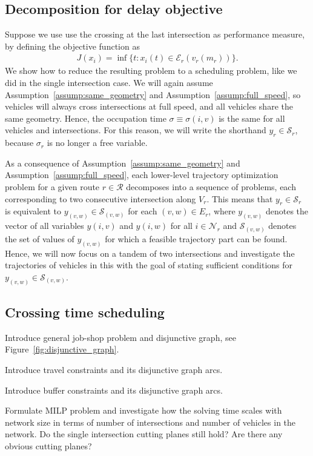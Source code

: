 \documentclass[a4paper]{article}
\theoremstyle{definition}
\theoremstyle{plain}
\begin{document}
\subsection{Decomposition for delay objective}

Suppose we use use the crossing at the last intersection as performance measure, by defining the
objective function as
\begin{align*}
  J(x_{i}) = \inf \{ t: x_{i}(t) \in \mathcal{E}_{r}(v_{r}(m_{r}))\} .
\end{align*}
%
We show how to reduce the resulting problem to a scheduling problem, like we did
in the single intersection case.
%
We will again assume Assumption~\ref{assump:same_geometry} and
Assumption~\ref{assump:full_speed}, so vehicles will always cross intersections
at full speed, and all vehicles share the same geometry. Hence, the occupation
time $\sigma \equiv \sigma(i,v)$ is the same for all vehicles and intersections. For this
reason, we will write the shorthand $y_{r} \in \mathcal{S}_{r}$, because $\sigma_{r}$
is no longer a free variable.

As a consequence of Assumption~\ref{assump:same_geometry} and Assumption~\ref{assump:full_speed},
each lower-level trajectory optimization problem for a given route
$r \in \mathcal{R}$ decomposes into a sequence of problems, each corresponding to
two consecutive intersection along $V_{r}$.
%
This means that $y_{r} \in \mathcal{S}_{r}$ is equivalent to
$y_{(v,w)} \in \mathcal{S}_{(v,w)}$ for each $(v,w) \in E_{r}$, where
$y_{(v,w)}$ denotes the vector of all variables $y(i, v)$ and $y(i, w)$ for all
$i \in \mathcal{N}_{r}$ and $\mathcal{S}_{(v,w)}$ denotes the set of values of $y_{(v,w)}$ for which a feasible trajectory part can be found.
%
Hence, we will now focus on a tandem of two intersections and investigate the
trajectories of vehicles in this with the goal of stating sufficient conditions
for $y_{(v,w)} \in \mathcal{S}_{(v,w)}$.

\subsection{Crossing time scheduling}

\begin{itemize}
  \renewcommand\labelitemi{--}
{\color{gray}
\item Introduce general job-shop problem and disjunctive graph, see Figure~\ref{fig:disjunctive_graph}.
\item Introduce travel constraints and its disjunctive graph arcs.
\item Introduce buffer constraints and its disjunctive graph arcs.

\item Formulate MILP problem and investigate how the solving time scales with network
size in terms of number of intersections and number of vehicles in the network.
Do the single intersection cutting planes still hold? Are there any obvious
cutting planes?
}
\end{itemize}
\end{document}
